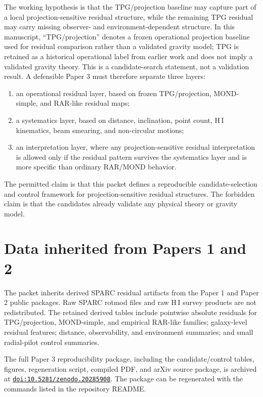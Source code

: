 \documentclass[11pt]{article}
\begin{document}
The working hypothesis is that the TPG/projection baseline may capture part of a local projection-sensitive residual structure, while the remaining TPG residual may carry missing observer- and environment-dependent structure. In this manuscript, ``TPG/projection'' denotes a frozen operational projection baseline used for residual comparison rather than a validated gravity model; TPG is retained as a historical operational label from earlier work and does not imply a validated gravity theory. This is a candidate-search statement, not a validation result. A defensible Paper 3 must therefore separate three layers:
\begin{enumerate}
\item an operational residual layer, based on frozen TPG/projection, MOND-simple, and RAR-like residual maps;
\item a systematics layer, based on distance, inclination, point count, H\,I kinematics, beam smearing, and non-circular motions;
\item an interpretation layer, where any projection-sensitive residual interpretation is allowed only if the residual pattern survives the systematics layer and is more specific than ordinary RAR/MOND behavior.
\end{enumerate}

The permitted claim is that this packet defines a reproducible candidate-selection and control framework for projection-sensitive residual structures. The forbidden claim is that the candidates already validate any physical theory or gravity model.

\section{Data inherited from Papers 1 and 2}

The packet inherits derived SPARC residual artifacts from the Paper 1 and Paper 2 public packages. Raw SPARC rotmod files and raw H\,I survey products are not redistributed. The retained derived tables include pointwise absolute residuals for TPG/projection, MOND-simple, and empirical RAR-like families; galaxy-level residual features; distance, observability, and environment summaries; and small radial-pilot control summaries.

The full Paper 3 reproducibility package, including the candidate/control tables, figures, regeneration script, compiled PDF, and arXiv source package, is archived at \href{https://doi.org/10.5281/zenodo.20285908}{\nolinkurl{doi:10.5281/zenodo.20285908}}. The package can be regenerated with the commands listed in the repository README.
\end{document}
